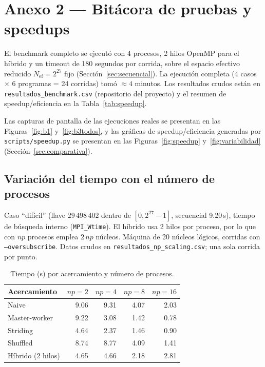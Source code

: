 \documentclass[11pt,letterpaper]{article}
\begin{document}
\section{Anexo 2 --- Bitácora de pruebas y speedups}
\label{sec:anexo2}

El benchmark completo se ejecutó con 4 procesos, 2 hilos OpenMP para el
híbrido y un timeout de 180 segundos por corrida, sobre el espacio
efectivo reducido $N_{\text{ef}}=2^{27}$ fijo
(Sección~\ref{sec:secuencial}). La ejecución completa (4 casos
$\times$ 6 programas = 24 corridas) tomó $\approx 4$ minutos. Los resultados crudos están
en \texttt{resultados\_benchmark.csv} (repositorio del proyecto) y el
resumen de speedup/eficiencia en la Tabla~\ref{tab:speedup}.

Las capturas de pantalla de las ejecuciones reales se presentan en las
Figuras~\ref{fig:b1} y~\ref{fig:b3todos}, y las gráficas de
speedup/eficiencia generadas por \texttt{scripts/speedup.py} se
presentan en las Figuras~\ref{fig:speedup} y~\ref{fig:variabilidad}
(Sección~\ref{sec:comparativa}).

\subsection*{Variación del tiempo con el número de procesos}
\label{sec:np}

Caso ``difícil'' (llave $29\,498\,402$ dentro de $[0,2^{27}-1]$,
secuencial 9.20\,s), tiempo de búsqueda interno (\texttt{MPI\_Wtime}).
El híbrido usa 2 hilos por proceso, por lo que con $np$ procesos emplea
$2\,np$ núcleos. Máquina de 20 núcleos lógicos, corridas con
\texttt{--oversubscribe}. Datos crudos en
\texttt{resultados\_np\_scaling.csv}; una sola corrida por punto.

\begin{table}[H]
\centering
\small
\begin{tabular}{lrrrr}
\toprule
\textbf{Acercamiento} & $np=2$ & $np=4$ & $np=8$ & $np=16$ \\
\midrule
Naive & 9.06 & 9.31 & 4.07 & 2.03 \\
Master-worker & 9.22 & 3.08 & 1.42 & 0.78 \\
Striding & 4.64 & 2.37 & 1.46 & 0.90 \\
Shuffled & 8.74 & 8.77 & 4.09 & 1.41 \\
Híbrido (2 hilos) & 4.65 & 4.66 & 2.18 & 2.81 \\
\bottomrule
\end{tabular}
\caption{Tiempo (s) por acercamiento y número de procesos.}
\label{tab:np}
\end{table}
\end{document}
